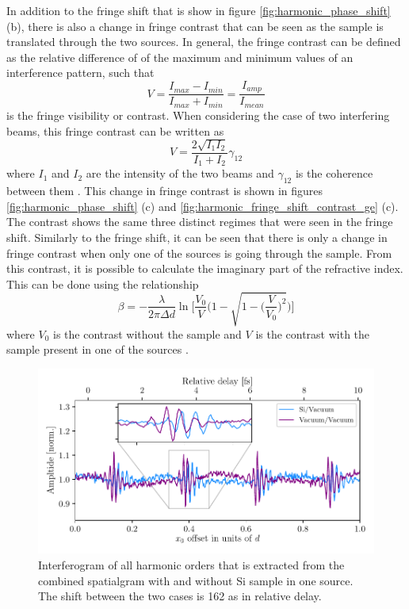 In addition to the fringe shift that is show in figure \ref{fig:harmonic_phase_shift} (b), there is also a change in fringe contrast that can be seen as the sample is translated through the two sources.  In general, the fringe contrast can be defined as the relative difference of of the maximum and minimum values of an interference pattern, such that
\begin{equation}
	V=\frac{I_{max} - I_{min}}{I_{max} + I_{min}} = \frac{I_{amp}}{I_{mean}}
\end{equation}
is the fringe visibility or contrast.  When considering the case of two interfering beams, this fringe contrast can be written as
\begin{equation}
\label{eqn:fringe_visibility} 
	V = \frac{2\sqrt{I_1 I_2}}{I_1 + I_2}\gamma_{12}
\end{equation}
where $I_1$ and $I_2$ are the intensity of the two beams and $\gamma_{12}$ is the coherence between them \cite{hemmersMulticolorXUVInterferometry2009, ditmireSpatialCoherenceMeasurement1996, wilsonDoubleSlitInterferometry2012}. 
This change in fringe contrast is shown in figures \ref{fig:harmonic_phase_shift} (c) and \ref{fig:harmonic_fringe_shift_contrast_ge} (c).  The contrast shows the same three distinct regimes that were seen in the fringe shift.  Similarly to the fringe shift, it can be seen that there is only a change in fringe contrast when only one of the sources is going through the sample.  From this contrast, it is possible to calculate the imaginary part of the refractive index.  This can be done using the relationship
\begin{equation}
\label{eqn:beta_fringe_contrast}
	\beta = -\frac{\lambda}{2\pi \Delta d} \ln\Bigg[\frac{V_0}{V}\Bigg(1-\sqrt{1-\bigg(\frac{V}{V_0}\bigg)^2}\Bigg)\Bigg]
\end{equation} 
where $V_0$ is the contrast without the sample and $V$ is the contrast with the sample present in one of the sources \cite{hemmersMulticolorXUVInterferometry2009}.



\begin{figure}
	\centering
	\includegraphics[width=1.0\textwidth]{figures/refractive_index/cross_correlation_si.pdf}
	\caption[Interferogram of all harmonic orders with and without Si sample in one source]{Interferogram of all harmonic orders that is extracted from the combined spatialgram with and without Si sample in one source.  The shift between the two cases is 162 as in relative delay.}
	\label{fig:interferogram_si}
\end{figure}

